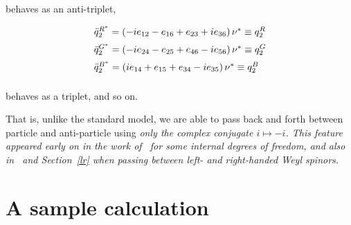 \documentclass[letterpaper,12pt,titlepage,oneside,final]{book}
\newcommand{\spacer}{0.2cm}
\begin{document}
\noindent behaves as an anti-triplet,

\begin{equation}\begin{array}{l}\label{antitriplet2}
\bar{q}^{R^*}_{2}=\left(-ie_{12}-e_{16}+e_{23}+ie_{36}\right)\nu^*\equiv q_2^R   \vspace{\spacer} \\
\bar{q}^{G^*}_{2}=\left(-ie_{24}-e_{25}+e_{46}-ie_{56}\right)\nu^*\equiv q_2^G \vspace{\spacer} \\
\bar{q}^{B^*}_{2}=\left(ie_{14}+e_{15}+e_{34}-ie_{35}\right)\nu^*\equiv q_2^B \vspace{\spacer} \\
\end{array}\end{equation}

\noindent behaves as a triplet, and so on.

That is, unlike the standard model, we are able to pass back and forth between particle and anti-particle using \it only \rm the complex conjugate $i\mapsto-i$.   This feature appeared early on in the work of~\cite{GGquarks} for some  internal degrees of freedom, and also in~\cite{UTI} and Section~\ref{lr} when passing between left- and right-handed Weyl spinors.  


\section{A sample calculation }
\end{document}
